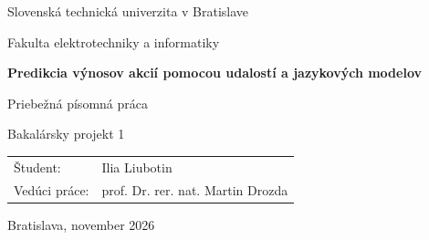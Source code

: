 \documentclass[sp,article]{FEIstyle}
\begin{document}
\begin{titlepage}
\centering
{\large Slovenská technická univerzita v Bratislave\par}
{\large Fakulta elektrotechniky a informatiky\par}
\vspace{3cm}
{\LARGE\bfseries Predikcia výnosov akcií pomocou udalostí a jazykových modelov\par}
\vspace{1.2cm}
{\large Priebežná písomná práca\par}
{\large Bakalársky projekt 1\par}
\vfill
\begin{tabular}{@{}ll@{}}
Študent: & Ilia Liubotin\\
Vedúci práce: & prof. Dr. rer. nat. Martin Drozda
\end{tabular}
\vspace{2cm}
\par Bratislava, november 2026
\end{titlepage}






\FloatBarrier


\printbibliography[title={Literatúra}]
\end{document}

